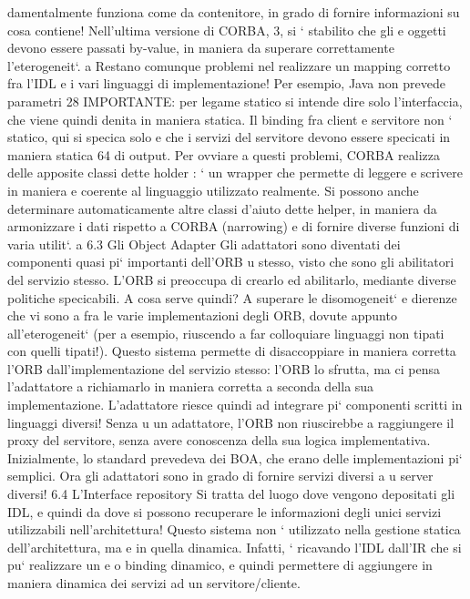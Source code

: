 \documentclass[a4paper,12pt]{article}
\begin{document}
damentalmente funziona come da contenitore, in grado di fornire informazioni
su cosa contiene! Nell'ultima versione di CORBA, 3, si ` stabilito che gli
e
oggetti devono essere passati by-value, in maniera da superare correttamente
l'eterogeneit`.
a
Restano comunque problemi nel realizzare un mapping corretto fra l'IDL e
i vari linguaggi di implementazione! Per esempio, Java non prevede parametri
28 IMPORTANTE: per legame statico si intende dire solo l'interfaccia, che viene quindi
denita in maniera statica. Il binding fra client e servitore non ` statico, qui si specica solo
e
che i servizi del servitore devono essere specicati in maniera statica
64
\newpage
di output. Per ovviare a questi problemi, CORBA realizza delle apposite classi dette holder : ` un wrapper che permette
di leggere e scrivere in maniera
e
coerente al linguaggio utilizzato realmente. Si possono anche determinare automaticamente altre classi d'aiuto dette
helper, in maniera da armonizzare i dati
rispetto a CORBA (narrowing) e di fornire diverse funzioni di varia utilit`.
a
6.3
Gli Object Adapter
Gli adattatori sono diventati dei componenti quasi pi` importanti dell'ORB
u
stesso, visto che sono gli abilitatori del servizio stesso. L'ORB si preoccupa di
crearlo ed abilitarlo, mediante diverse politiche specicabili.
A cosa serve quindi? A superare le disomogeneit` e dierenze che vi sono
a
fra le varie implementazioni degli ORB, dovute appunto all'eterogeneit` (per
a
esempio, riuscendo a far colloquiare linguaggi non tipati con quelli tipati!).
Questo sistema permette di disaccoppiare in maniera corretta l'ORB dall'implementazione del servizio stesso: l'ORB lo
sfrutta, ma ci pensa l'adattatore a
richiamarlo in maniera corretta a seconda della sua implementazione. L'adattatore riesce quindi ad integrare pi`
componenti scritti in linguaggi diversi! Senza
u
un adattatore, l'ORB non riuscirebbe a raggiungere il proxy del servitore, senza
avere conoscenza della sua logica implementativa.
Inizialmente, lo standard prevedeva dei BOA, che erano delle implementazioni pi` semplici. Ora gli adattatori sono in
grado di fornire servizi diversi a
u
server diversi!
6.4
L'Interface repository
Si tratta del luogo dove vengono depositati gli IDL, e quindi da dove si possono
recuperare le informazioni degli unici servizi utilizzabili nell'architettura!
Questo sistema non ` utilizzato nella gestione statica dell'architettura, ma
e
in quella dinamica. Infatti, ` ricavando l'IDL dall'IR che si pu` realizzare un
e
o
binding dinamico, e quindi permettere di aggiungere in maniera dinamica dei
servizi ad un servitore/cliente.
\end{document}
